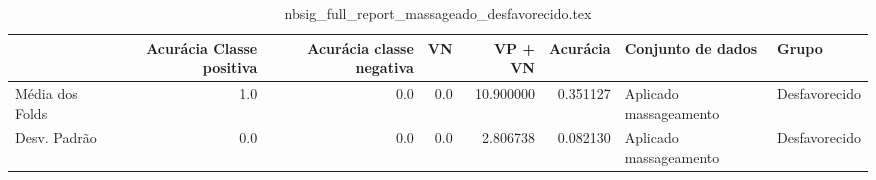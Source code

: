 \begin{table}
\centering
\caption{nbsig_full_report_massageado_desfavorecido.tex}
\label{nbsig_full_report_massageado_desfavorecido.tex}
\begin{tabular}{lrrrrrll}
\toprule
{} &  Acurácia Classe positiva &  Acurácia classe negativa &  VN  &   VP + VN  &  Acurácia &       Conjunto de dados &          Grupo \\
\midrule
Média dos Folds &                       1.0 &                       0.0 &  0.0 &  10.900000 &  0.351127 &  Aplicado massageamento &  Desfavorecido \\
Desv. Padrão    &                       0.0 &                       0.0 &  0.0 &   2.806738 &  0.082130 &  Aplicado massageamento &  Desfavorecido \\
\bottomrule
\end{tabular}
\end{table}
